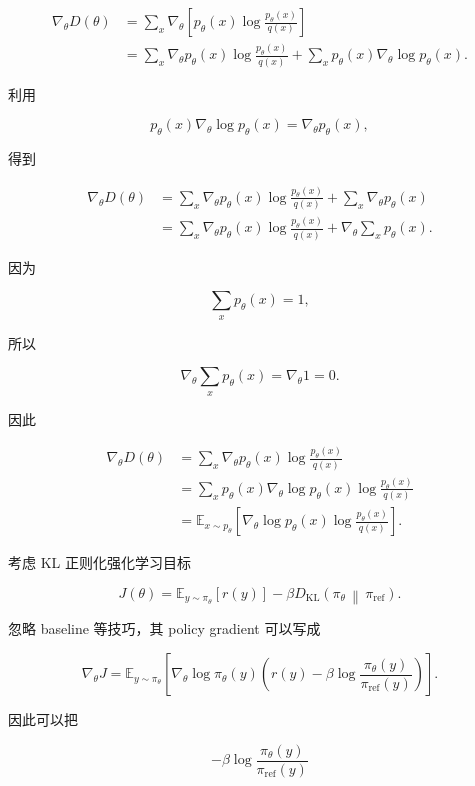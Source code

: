 \documentclass[11pt,a4paper]{ctexart}
\newcommand{\KL}[2]{D_{\mathrm{KL}}\!\left(#1\,\middle\|\,#2\right)}
\newcommand{\E}{\mathbb{E}}
\newcommand{\piref}{\pi_{\mathrm{ref}}}
\newcommand{\pitheta}{\pi_{\theta}}
\begin{document}
\begin{align}
\nabla_\theta D(\theta)
&=
\sum_x
\nabla_\theta
\left[
p_\theta(x)
\log
\frac{p_\theta(x)}{q(x)}
\right]
\\
&=
\sum_x
\nabla_\theta p_\theta(x)
\log
\frac{p_\theta(x)}{q(x)}
+
\sum_x
p_\theta(x)
\nabla_\theta
\log p_\theta(x).
\end{align}

利用

\[
p_\theta(x)\nabla_\theta\log p_\theta(x)
=
\nabla_\theta p_\theta(x),
\]

得到

\begin{align}
\nabla_\theta D(\theta)
&=
\sum_x
\nabla_\theta p_\theta(x)
\log
\frac{p_\theta(x)}{q(x)}
+
\sum_x
\nabla_\theta p_\theta(x)
\\
&=
\sum_x
\nabla_\theta p_\theta(x)
\log
\frac{p_\theta(x)}{q(x)}
+
\nabla_\theta
\sum_x p_\theta(x).
\end{align}

因为

\[
\sum_x p_\theta(x)=1,
\]

所以

\[
\nabla_\theta
\sum_x p_\theta(x)
=
\nabla_\theta 1
=
0.
\]

因此

\begin{align}
\nabla_\theta D(\theta)
&=
\sum_x
\nabla_\theta p_\theta(x)
\log
\frac{p_\theta(x)}{q(x)}
\\
&=
\sum_x
p_\theta(x)
\nabla_\theta\log p_\theta(x)
\log
\frac{p_\theta(x)}{q(x)}
\\
&=
\E_{x\sim p_\theta}
\left[
\nabla_\theta\log p_\theta(x)
\log
\frac{p_\theta(x)}{q(x)}
\right].
\label{eq:kl_gradient}
\end{align}

考虑 KL 正则化强化学习目标

\[
J(\theta)
=
\E_{y\sim\pitheta}[r(y)]
-
\beta
\KL{\pitheta}{\piref}.
\]

忽略 baseline 等技巧，其 policy gradient 可以写成

\begin{equation}
\nabla_\theta J
=
\E_{y\sim\pitheta}
\left[
\nabla_\theta\log\pitheta(y)
\left(
r(y)
-
\beta
\log\frac{\pitheta(y)}{\piref(y)}
\right)
\right].
\end{equation}

因此可以把

\begin{equation}
-\beta
\log\frac{\pitheta(y)}{\piref(y)}
\end{equation}
\end{document}
